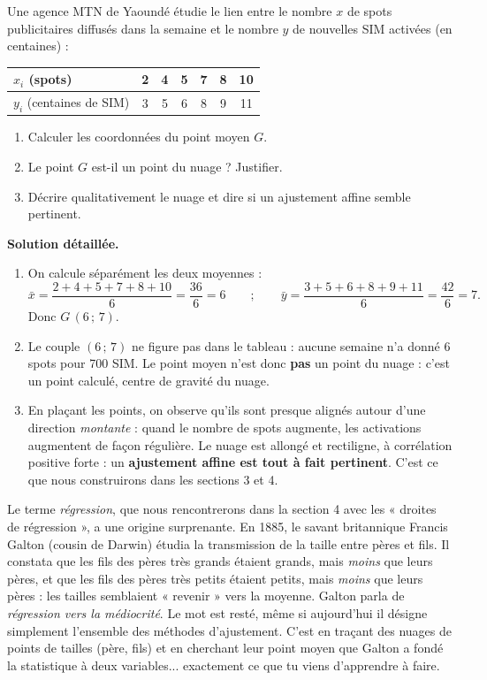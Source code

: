 \documentclass[11pt]{article}
\begin{document}
\begin{exoresolu}
Une agence MTN de Yaoundé étudie le lien entre le nombre $x$ de spots publicitaires diffusés dans la semaine et le nombre $y$ de nouvelles SIM activées (en centaines) :
\begin{center}
\begin{tabular}{|l|c|c|c|c|c|c|}
\hline
\rowcolor{popblueL} $x_i$ (spots) & 2 & 4 & 5 & 7 & 8 & 10 \\
\hline
$y_i$ (centaines de SIM) & 3 & 5 & 6 & 8 & 9 & 11 \\
\hline
\end{tabular}
\end{center}
\begin{enumerate}
\item Calculer les coordonnées du point moyen $G$.
\item Le point $G$ est-il un point du nuage ? Justifier.
\item Décrire qualitativement le nuage et dire si un ajustement affine semble pertinent.
\end{enumerate}
\tcblower
\textbf{Solution détaillée.}
\begin{enumerate}
\item On calcule séparément les deux moyennes :
\[ \bar{x} = \frac{2+4+5+7+8+10}{6} = \frac{36}{6} = 6 \qquad ; \qquad \bar{y} = \frac{3+5+6+8+9+11}{6} = \frac{42}{6} = 7. \]
Donc $G\,(6\,;\,7)$.
\item Le couple $(6\,;\,7)$ ne figure pas dans le tableau : aucune semaine n'a donné 6 spots pour 700 SIM. Le point moyen n'est donc \textbf{pas} un point du nuage : c'est un point calculé, centre de gravité du nuage.
\item En plaçant les points, on observe qu'ils sont presque alignés autour d'une direction \emph{montante} : quand le nombre de spots augmente, les activations augmentent de façon régulière. Le nuage est allongé et rectiligne, à corrélation positive forte : un \textbf{ajustement affine est tout à fait pertinent}. C'est ce que nous construirons dans les sections 3 et 4.
\end{enumerate}
\end{exoresolu}

\begin{savaistu}
Le terme \emph{régression}, que nous rencontrerons dans la section 4 avec les « droites de régression », a une origine surprenante. En 1885, le savant britannique Francis Galton (cousin de Darwin) étudia la transmission de la taille entre pères et fils. Il constata que les fils des pères très grands étaient grands, mais \emph{moins} que leurs pères, et que les fils des pères très petits étaient petits, mais \emph{moins} que leurs pères : les tailles semblaient « revenir » vers la moyenne. Galton parla de \emph{régression vers la médiocrité}. Le mot est resté, même si aujourd'hui il désigne simplement l'ensemble des méthodes d'ajustement. C'est en traçant des nuages de points de tailles (père, fils) et en cherchant leur point moyen que Galton a fondé la statistique à deux variables... exactement ce que tu viens d'apprendre à faire.
\end{savaistu}
\end{document}
